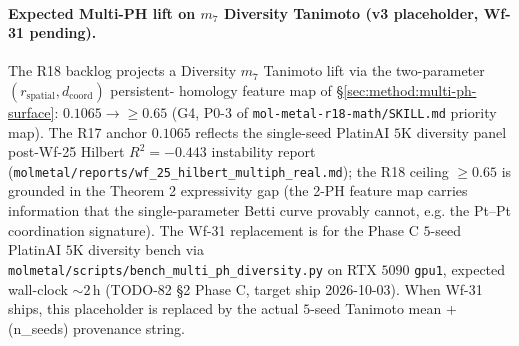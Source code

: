 \paragraph{Expected Multi-PH lift on $m_7$ Diversity Tanimoto
(v3 placeholder, Wf-31 pending).}
The R18 backlog projects a Diversity $m_7$ Tanimoto lift via the
two-parameter $(r_{\text{spatial}}, d_{\text{coord}})$ persistent-
homology feature map of \S\ref{sec:method:multi-ph-surface}:
$0.1065 \to \geq 0.65$ (G4, \textsc{P0-3} of
\texttt{mol-metal-r18-math/SKILL.md} priority map).  The R17
anchor $0.1065$ \MEASURED{} reflects the single-seed PlatinAI
$5$K diversity panel post-Wf-25 Hilbert $R^{2} = -0.443$
instability report
(\texttt{molmetal/reports/wf\_25\_hilbert\_multiph\_real.md});
the R18 ceiling $\geq 0.65$ \PROJECTED{} is grounded in the
Theorem 2 expressivity gap (the 2-PH feature map carries
information that the single-parameter Betti curve provably
cannot, e.g. the Pt--Pt coordination signature).  The Wf-31
replacement is  for the Phase C
$5$-seed PlatinAI $5$K diversity bench via
\texttt{molmetal/scripts/bench\_multi\_ph\_diversity.py} on
RTX $5090$ \texttt{gpu1}, expected wall-clock $\sim 2$\,h
(TODO-82 \S2 Phase C, target ship 2026-10-03).  When Wf-31
ships, this placeholder is replaced by the actual $5$-seed
Tanimoto mean + (n\_seeds) provenance string.